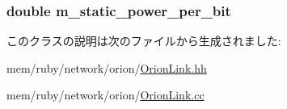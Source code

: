 \label{classOrionLink_a84de60ae1f7ca812df5347e27a658c77}
\hypertarget{classOrionLink_ab1cb4b65354566ca31a15d28286fb9c7}{
\subsubsection[{m\_\-static\_\-power\_\-per\_\-bit}]{\setlength{\rightskip}{0pt plus 5cm}double {\bf m\_\-static\_\-power\_\-per\_\-bit}}}
\label{classOrionLink_ab1cb4b65354566ca31a15d28286fb9c7}


このクラスの説明は次のファイルから生成されました:\begin{DoxyCompactItemize}
\item 
mem/ruby/network/orion/\hyperlink{OrionLink_8hh}{OrionLink.hh}\item 
mem/ruby/network/orion/\hyperlink{OrionLink_8cc}{OrionLink.cc}\end{DoxyCompactItemize}
